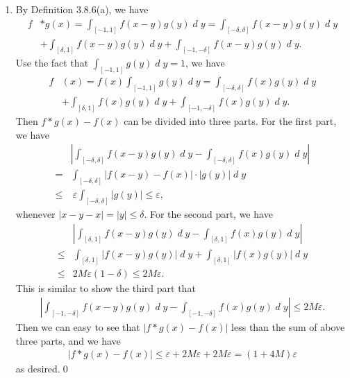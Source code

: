 \documentclass{book}
\DeclareMathOperator{\dd}{\mathit{d}}%
\begin{document}
\begin{enumerate}
    \item By Definition 3.8.6(a), we have
        \begin{align*}
            f&*g(x)
            = \int_{[-1, 1]} f(x - y)g(y) \dd y
            = \int_{[-\delta, \delta]} f(x - y)g(y) \dd y\\
            &+ \int_{[\delta, 1]} f(x - y)g(y) \dd y
            + \int_{[-1, -\delta]} f(x - y)g(y) \dd y.
        \end{align*}
    Use the fact that $\int_{[-1, 1]} g(y) \dd y = 1$, we have
        \begin{align*}
            f&(x)
            = f(x)\int_{[-1, 1]}g(y) \dd y
            = \int_{[-\delta, \delta]} f(x)g(y) \dd y\\
            &+ \int_{[\delta, 1]} f(x)g(y) \dd y
            + \int_{[-1, -\delta]} f(x)g(y) \dd y.
        \end{align*}
    Then $f*g(x) - f(x)$ can be divided into three parts. For the first part, we have
        \begin{align*}
            &\left|\int_{[-\delta, \delta]} f(x - y)g(y) \dd y - \int_{[-\delta, \delta]} f(x)g(y) \dd y\right|\\
            =& \int_{[-\delta, \delta]} |f(x - y) - f(x)| \cdot |g(y)| \dd y\\
            \leq&~ \varepsilon\int_{[-\delta, \delta]}|g(y)|
            \leq \varepsilon,
        \end{align*}
    whenever $|x - y - x| = |y| \leq \delta$. For the second part, we have
        \begin{align*}
            &\left|\int_{[\delta, 1]} f(x - y)g(y) \dd y - \int_{[\delta, 1]} f(x)g(y) \dd y\right|\\
            \leq& \int_{[\delta, 1]} |f(x - y)g(y)| \dd y + \int_{[\delta, 1]} |f(x)g(y)| \dd y\\
            \leq& 2M\varepsilon(1 - \delta) \leq 2M\varepsilon.
        \end{align*}
    This is similar to show the third part that
        \begin{align*}
            \left|\int_{[-1, -\delta]} f(x - y)g(y) \dd y - \int_{[-1, -\delta]} f(x)g(y) \dd y\right| \leq 2M\varepsilon.
        \end{align*}
    Then we can easy to see that $|f*g(x) - f(x)|$ less than the sum of above three parts, and we have
        \begin{align*}
            |f*g(x) - f(x)| \leq \varepsilon + 2M\varepsilon + 2M\varepsilon = (1 + 4M)\varepsilon
        \end{align*}
    as desired.\qed
\end{enumerate}
\end{document}
